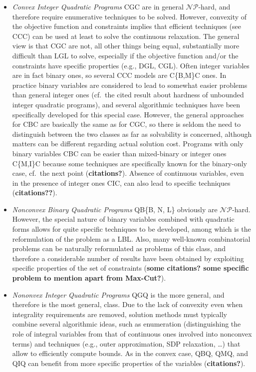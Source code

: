 \begin{itemize}
 \item \emph{Convex Integer Quadratic Programs} CGC are in general $\mathcal{NP}$-hard, and therefore require enumerative techniques to be solved. However, convexity of the objective function and constraints implies that efficient techniques (see CCC) can be used at least to solve the continuous relaxation. The general view is that CGC are not, all other things being equal, 
 substantially more difficult than LGL to solve, especially if the objective function and/or the constraints have specific properties (e.g., DGL, CGL). Often integer variables are in fact binary ones, so several CCC models are C\{B,M\}C ones. In practice binary variables are considered to lead to somewhat easier problems than general integer ones (cf.~the cited result about hardness of unbounded integer quadratic programs), and several algorithmic techniques have been specifically developed for this special case. However, the general approaches for CBC are basically the same as for CGC, so there is seldom the need to distinguish between the two classes as far as solvability is concerned, although matters can be different regarding actual solution cost. Programs with only binary variables CBC can be easier than mixed-binary or integer ones C\{M,I\}C because some techniques are specifically known for the binary-only case, cf.~the next point ({\bf citations?}). Absence of continuous variables, even in the presence of integer ones CIC, can also lead to specific techniques ({\bf citations??}).  
  \item \emph{Nonconvex Binary Quadratic Programs} QB\{B, N, L\} obviously are $\mathcal{NP}$-hard. However, the special nature of binary variables combined with quadratic forms allows for quite specific techniques to be developed, among which is the reformulation of the problem as a LBL. Also, many well-known combinatorial problems can be naturally reformulated as problems of this class, and therefore a considerable number of results have been obtained by exploiting specific properties of the set of constraints ({\bf some citations? some specific problem to mention apart from Max-Cut?}).
  \item \emph{Nononvex Integer Quadratic Programs} QGQ is the more general, and therefore is the most general, class. Due to the lack of convexity even when integrality requirements are removed, solution methods must typically combine several algorithmic ideas, such as enumeration (distinguishing the role of integral variables from that of continuous ones involved into nonconvex terms) and techniques (e.g., outer approximation, SDP relaxation, \ldots) that allow to efficiently compute bounds. As in the convex case, QBQ, QMQ, and QIQ can benefit from more specific properties of the variables ({\bf citations?}).
\end{itemize}
